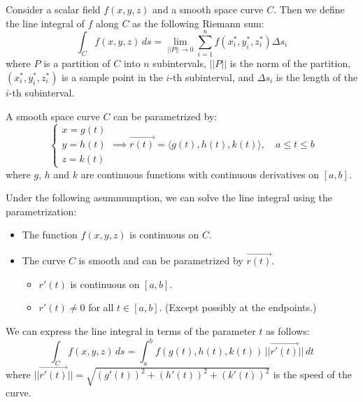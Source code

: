 \documentclass[11pt]{report}
\begin{document}
\begin{definition}
    Consider a scalar field $f(x,y,z)$ and a smooth space curve $C$. Then we define the line integral of $f$ along $C$ as the following Riemann sum:
    $$
        \int_C f(x,y,z) \, ds = \lim_{||P|| \to 0} \sum_{i=1}^n f(x_i^*, y_i^*, z_i^*) \Delta s_i
    $$
    where $P$ is a partition of $C$ into $n$ subintervals, $||P||$ is the norm of the partition, $(x_i^*, y_i^*, z_i^*)$ is a sample point in the $i$-th subinterval, and $\Delta s_i$ is the length of the $i$-th subinterval.

    A smooth space curve $C$ can be parametrized by:
    \begin{equation}
        \begin{cases}
            x = g(t) \\
            y = h(t) \\
            z = k(t)
        \end{cases} \implies \vec{r(t)} = \langle g(t), h(t), k(t) \rangle, \quad a \leq t \leq b
    \end{equation}
    where $g$, $h$ and $k$ are continuous functions with continuous derivatives on $[a,b]$.

    Under the following asummumption, we can solve the line integral using the parametrization:
    \begin{itemize}
        \item The function $f(x,y,z)$ is continuous on $C$.
        \item The curve $C$ is smooth and can be parametrized by $\vec{r(t)}$.
        \begin{itemize}
            \item $r'(t)$ is continuous on $[a,b]$.
            \item $r'(t) \neq 0$ for all $t \in [a,b]$. (Except possibly at the endpoints.) 
        \end{itemize}
    \end{itemize}

    We can express the line integral in terms of the parameter $t$ as follows:
    \begin{equation}
        \int_C f(x,y,z) \, ds = \int_a^b f(g(t), h(t), k(t)) \, ||\vec{r'(t)}|| \, dt
    \end{equation}
    where $||\vec{r'(t)}|| = \sqrt{(g'(t))^2 + (h'(t))^2 + (k'(t))^2}$ is the speed of the curve.
\end{definition}
\end{document}

